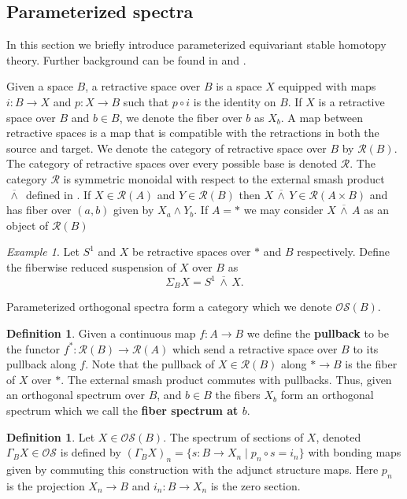 \documentclass[11pt]{amsart}
\newcommand{\beforesubsection}{\vspace{1em}}
\newcommand{\aftersubsection}{}
\newcommand{\barsmash}{\,\overline\wedge\,}
\newcommand{\Osp}{\mathcal{OS}}
\theoremstyle{plain}   %
\theoremstyle{definition}
\newtheorem{df}[thm]{Definition}
\theoremstyle{remark}
\newtheorem{ex}[thm]{Example}
\numberwithin{equation}{section}
\begin{document}
\beforesubsection
\subsection{Parameterized spectra}\aftersubsection

In this section we briefly introduce parameterized equivariant stable homotopy theory. Further background can be found in \cite{ms} and \cite{malkiewich_convenient}.

Given a space $B$, a retractive space over $B$ is a space $X$ equipped with maps $i:B\to X$ and $p:X\to B$ such that $p\circ i$ is the identity on $B$. If $X$ is a retractive space over $B$ and $b\in B$, we denote the fiber over $b$ as $X_b$. A map between retractive spaces is a map that is compatible with the retractions in both the source and target. We denote the category of retractive space over $B$ by $\mathcal{R}(B)$. The category of retractive spaces over every possible base is denoted $\mathcal{R}$. The category $\mathcal{R}$ is symmetric monoidal with respect to the external smash product $\barsmash$ defined in \cite{malkiewich_convenient}. If $X\in \mathcal{R}(A)$ and $Y\in \mathcal{R}(B)$ then $X\barsmash Y\in \mathcal{R}(A\times B)$ and has fiber over $(a,b)$ given by $X_a\wedge Y_b$. If $A=*$ we may consider $X\barsmash A$ as an object of $\mathcal{R}(B)$ 

\begin{ex}
Let $S^1$ and $X$ be  retractive spaces over $*$ and $B$ respectively. Define the fiberwise reduced suspension of $X$ over $B$ as 
\[
\Sigma_B X = S^1\barsmash X.
\]
\end{ex}

Parameterized orthogonal spectra form a category which we denote $\Osp(B)$. 


\begin{df}
Given a continuous map $f:A\to B$ we define the \textbf{pullback} to be the functor $f^*:\mathcal{R}(B)\to \mathcal{R}(A)$ which send a retractive space over $B$ to its pullback along $f$. Note that the pullback of $X\in \mathcal{R}(B)$ along $*\to B$ is the fiber of $X$ over $*$. The external smash product commutes with pullbacks. Thus, given an orthogonal spectrum over $B$, and $b\in B$ the fibers $X_b$ form an orthogonal spectrum which we call the \textbf{fiber spectrum at $b$}. 
\end{df}

\begin{df}\label{df:spectrum of sections}
Let $X\in \Osp(B)$. The spectrum of sections of $X$, denoted $\Gamma_BX\in \Osp$ is defined by $(\Gamma_BX)_n = \{s:B\to X_n\mid p_n\circ s=i_n\}$ with bonding maps given by commuting this construction with the adjunct structure maps. Here $p_n$ is the projection $X_n\to B$ and $i_n:B\to X_n$ is the zero section.   
\end{df}
\end{document}

